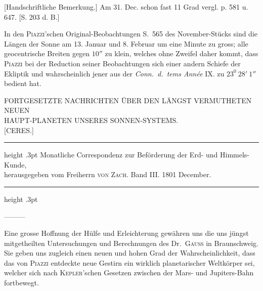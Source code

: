 \expandafter\def\csname HistoricalNoteText16\endcsname{[Handschriftliche Bemerkung.] Am 31. Dec. schon fast 11 Grad vergl. p. 581 u. 647. [S. 203 d. B.]}
\par\clearpage
\expandafter\def\csname HistoricalNoteText17\endcsname{In den \textsc{Piazzi}'schen Original-Beobachtungen S.\ 565 des November-Stücks sind die Längen der Sonne am 13. Januar und 8. Februar um eine Minute zu gross; alle geocentrische Breiten gegen $10''$ zu klein, welches ohne Zweifel daher kommt, dass \textsc{Piazzi} bei der Reduction seiner Beobachtungen sich einer andern Schiefe der Ekliptik und wahrscheinlich jener aus der \textit{Conn.\ d.\ tems Année} IX. zu $23^0\ 28'\ 1''$ bedient hat.}
\fancyhead[L]{\small [CERES.]}
\begingroup
\pagestyle{empty}
\newcommand{\GaussVIPageNote}[2]{%
  \par\nobreak\smallskip
  \noindent\rule{.24\linewidth}{.3pt}\par\nobreak\smallskip
  {\footnotesize\indent\hypertarget{native-#1-note}{}*)\enspace
   \csname HistoricalNoteText#2\endcsname\par}%
}
\thispagestyle{empty}
\noindent{}%
\null\par\nobreak
\vspace*{1.5\baselineskip}
\begin{center}
{\footnotesize
FORTGESETZTE NACHRICHTEN ÜBER DEN LÄNGST VERMUTHETEN NEUEN\\
HAUPT-PLANETEN UNSERES SONNEN-SYSTEMS.\\
{[CERES.]}\par}
\end{center}
\begin{center}
\parbox{.77\linewidth}{%
  \centering\fontsize{8}{10}\selectfont\frenchspacing
  \hrule height .3pt\relax\vspace{3pt}
  Monatliche Correspondenz zur Beförderung der Erd- und Himmels-Kunde,\\
  herausgegeben vom Freiherrn \textsc{von Zach}. Band III. 1801 December.\par
  \vspace{3pt}\hrule height .3pt\relax
}
\end{center}
\noindent\hspace*{\parindent}—\quad —\quad —\par\nobreak
\fontsize{10.5}{12}\selectfont
\indent Eine grosse Hoffnung der Hülfe und Erleichterung gewähren uns die uns jüngst mitgetheilten Untersuchungen und Berechnungen des Dr.\ \textsc{Gauss} in Braunschweig. Sie geben uns zugleich einen neuen und hohen Grad der Wahrscheinlichkeit, dass das von \textsc{Piazzi} entdeckte neue Gestirn ein wirklich planetarischer Weltkörper sei, welcher sich nach \textsc{Kepler}'schen Gesetzen zwischen der Mars- und Jupiters-Bahn fortbewegt.

